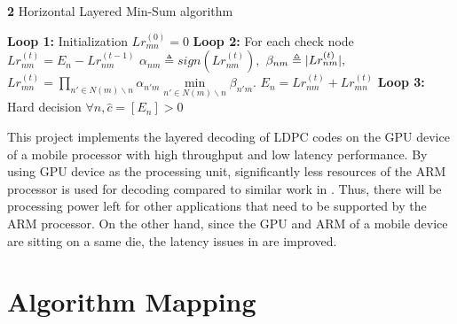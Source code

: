 \documentclass{article}
\DeclarePairedDelimiter\abs{\lvert}{\rvert}%
\begin{document}
\begin{algorithm}[H]
\renewcommand\thealgorithm{}
\caption{\textbf{2} Horizontal Layered Min-Sum algorithm}\label{algorithm2}
\begin{algorithmic}[1]
\STATE \textbf{Loop 1:} Initialization
\STATE
$Lr_{mn}^{(0)}=0$%
\ENDFOR
{}
\STATE \textbf{Loop 2:} For each check node
\STATE$Lr_{nm}^{(t)}=E_n - Lr_{nm}^{(t-1)}$
\ENDFOR
{}
\STATE $\alpha_{nm} \triangleq sign(Lr_{nm}^{(t)}),$
\STATE $\beta_{nm} \triangleq \abs{Lr_{nm}^{(t)}},$
\STATE $Lr_{mn}^{(t)} = \prod\limits_{n' \in N(m)\backslash n} \alpha_{n'm} \min\limits_{n' \in N(m)\backslash n} \beta_{n'm}.$
\ENDFOR
{}
\STATE$E_n = Lr_{nm}^{(t)}+Lr_{mn}^{(t)}$
\ENDFOR
\ENDFOR
\STATE \textbf{Loop 3:} Hard decision
\STATE $\forall n, \hat{c}=[E_n]>0$
\ENDFOR
\ENDFOR %
\end{algorithmic}
\addtocounter{algorithm}{-1}
\end{algorithm}
This project implements the layered decoding of LDPC codes on the GPU device of a mobile processor with high throughput and low latency performance. By using GPU device as the processing unit, significantly less resources of the ARM processor is used for decoding compared to similar work in \cite{art_neon}. Thus, there will be processing power left for other applications that need to be supported by the ARM processor. On the other hand, since the GPU and ARM of a mobile device are sitting on a same die, the latency issues in \cite{art_gpu_0} are improved.
\section{Algorithm Mapping}\label{sec3}
\end{document}
